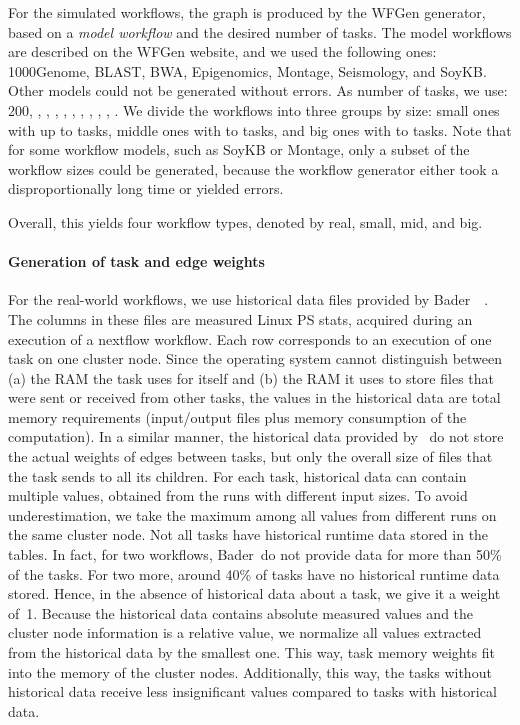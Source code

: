 \documentclass[conference]{IEEEtran}
\begin{document}
    For the simulated workflows, the graph is produced by the WFGen generator, based on a {\em model workflow} and
    the desired number of tasks.
    The model workflows are described on the WFGen website, and we used the following ones:
    1000Genome, BLAST, BWA, Epigenomics, Montage, Seismology, and SoyKB.
    Other models could not be generated without errors.
%
    As number of tasks, we use: 200, , , , , ,
    , , , , .
    We divide the workflows into three groups by size: small ones with up to  tasks, middle
    ones with  to  tasks, and big ones with  to  tasks.
    Note that for some workflow models, such as SoyKB or Montage, only a subset of the workflow sizes could be generated,
    because the workflow generator either took a disproportionally long time or yielded errors.

    Overall, this yields four workflow types, denoted by real, small, mid, and big.

    \paragraph{Generation of task and edge weights}
    For the real-world workflows, we use historical data files provided by Bader~\etal~\cite{lotaru}.
    The columns in these files are measured Linux PS stats, acquired during an execution of a nextflow workflow.
    Each row corresponds to an execution of one task on one cluster node.
    Since the operating system cannot distinguish between (a) the RAM the task uses for itself and (b) the RAM it uses
    to store files that were sent or received from other tasks, the values in the historical data are total memory requirements (input/output files plus memory consumption of the computation).
    In a similar manner, the historical data provided by~\cite{lotaru} do not store the actual weights of edges between tasks, but only the overall
    size of files that the task sends to all its children.
    For each task, historical data can contain multiple values, obtained from the runs with different input sizes.
    To avoid underestimation, we take the maximum among all values from different runs on the same cluster node.
    Not all tasks have historical runtime data stored in the tables.
    In fact, for two workflows, Bader~\etal do not provide data for more than 50\% of the tasks.
    For two more, around 40\% of tasks have no historical runtime data stored.
    Hence, in the absence of historical data about a task, we give it a weight of~1.
%
    Because the historical data contains absolute measured values and the cluster node information is a relative value,
    we normalize all values extracted from the historical data by the smallest one.
    This way, task memory weights fit into the memory of the cluster nodes.
    Additionally, this way, the tasks without historical data receive less insignificant values compared to tasks with historical data.
\end{document}

